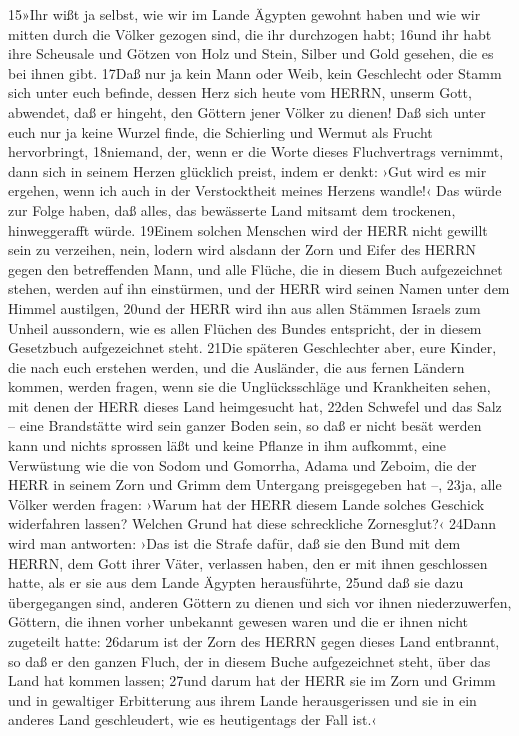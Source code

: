 15»Ihr wißt ja selbst, wie wir im Lande Ägypten gewohnt haben und wie
wir mitten durch die Völker gezogen sind, die ihr durchzogen habt; 16und
ihr habt ihre Scheusale und Götzen von Holz und Stein, Silber und Gold
gesehen, die es bei ihnen gibt. 17Daß nur ja kein Mann oder Weib, kein
Geschlecht oder Stamm sich unter euch befinde, dessen Herz sich heute
vom HERRN, unserm Gott, abwendet, daß er hingeht, den Göttern jener
Völker zu dienen! Daß sich unter euch nur ja keine Wurzel finde, die
Schierling und Wermut als Frucht hervorbringt, 18niemand, der, wenn er
die Worte dieses Fluchvertrags vernimmt, dann sich in seinem Herzen
glücklich preist, indem er denkt: ›Gut wird es mir ergehen, wenn ich
auch in der Verstocktheit meines Herzens wandle!‹ Das würde zur Folge
haben, daß alles, das bewässerte Land mitsamt dem trockenen,
hinweggerafft würde. 19Einem solchen Menschen wird der HERR nicht
gewillt sein zu verzeihen, nein, lodern wird alsdann der Zorn und Eifer
des HERRN gegen den betreffenden Mann, und alle Flüche, die in diesem
Buch aufgezeichnet stehen, werden auf ihn einstürmen, und der HERR wird
seinen Namen unter dem Himmel austilgen, 20und der HERR wird ihn aus
allen Stämmen Israels zum Unheil aussondern, wie es allen Flüchen des
Bundes entspricht, der in diesem Gesetzbuch aufgezeichnet steht. 21Die
späteren Geschlechter aber, eure Kinder, die nach euch erstehen werden,
und die Ausländer, die aus fernen Ländern kommen, werden fragen, wenn
sie die Unglücksschläge und Krankheiten sehen, mit denen der HERR dieses
Land heimgesucht hat, 22den Schwefel und das Salz -- eine Brandstätte
wird sein ganzer Boden sein, so daß er nicht besät werden kann und
nichts sprossen läßt und keine Pflanze in ihm aufkommt, eine Verwüstung
wie die von Sodom und Gomorrha, Adama und Zeboim, die der HERR in seinem
Zorn und Grimm dem Untergang preisgegeben hat --, 23ja, alle Völker
werden fragen: ›Warum hat der HERR diesem Lande solches Geschick
widerfahren lassen? Welchen Grund hat diese schreckliche Zornesglut?‹
24Dann wird man antworten: ›Das ist die Strafe dafür, daß sie den Bund
mit dem HERRN, dem Gott ihrer Väter, verlassen haben, den er mit ihnen
geschlossen hatte, als er sie aus dem Lande Ägypten herausführte, 25und
daß sie dazu übergegangen sind, anderen Göttern zu dienen und sich vor
ihnen niederzuwerfen, Göttern, die ihnen vorher unbekannt gewesen waren
und die er ihnen nicht zugeteilt hatte: 26darum ist der Zorn des HERRN
gegen dieses Land entbrannt, so daß er den ganzen Fluch, der in diesem
Buche aufgezeichnet steht, über das Land hat kommen lassen; 27und darum
hat der HERR sie im Zorn und Grimm und in gewaltiger Erbitterung aus
ihrem Lande herausgerissen und sie in ein anderes Land geschleudert, wie
es heutigentags der Fall ist.‹

